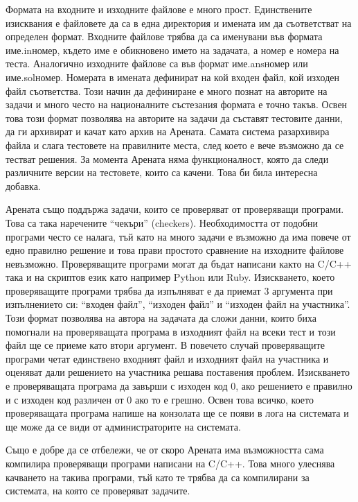 \documentclass[a4paper,12pt]{article}
\begin{document}
    Формата на входните и изходните файлове е много прост. Единствените изисквания е файловете да са в една директория и имената им да съответстват на определен формат. Входните файлове трябва да са именувани във формата {име}.in{номер}, където {име} е обикновено името на задачата, а {номер} е номера на теста. Аналогично изходните файлове са във формат {име}.ans{номер} или {име}.sol{номер}. Номерата в имената дефинират на кой входен файл, кой изходен файл съответства. Този начин да дефиниране е много познат на авторите на задачи и много често на националните състезания формата е точно такъв. Освен това този формат позволява на авторите на задачи да съставят тестовите данни, да ги архивират и качат като архив на Арената. Самата система разархивира файла и слага тестовете на правилните места, след което е вече възможно да се тестват решения. За момента Арената няма функционалност, която да следи различните версии на тестовете, които са качени. Това би била интересна добавка.
    
    Арената също поддържа задачи, които се проверяват от проверяващи програми. Това са така наречените ``чекъри'' (checkers). Необходимостта от подобни програми често се налага, тъй като на много задачи е възможно да има повече от едно правилно решение и това прави простото сравнение на изходните файлове невъзможно. Проверяващите програми могат да бъдат написани както на C/C++ така и на скриптов език като например Python или Ruby. Изискването, което проверяващите програми трябва да изпълняват е да приемат 3 аргумента при изпълнението си: ``входен файл'', ``изходен файл'' и ``изходен файл на участника''. Този формат позволява на автора на задачата да сложи данни, които биха помогнали на проверяващата програма в изходният файл на всеки тест и този файл ще се приеме като втори аргумент. В повечето случай проверяващите програми четат единствено входният файл и изходният файл на участника и оценяват дали решението на участника решава поставения проблем. Изискването е проверяващата програма да завърши с изходен код 0, ако решението е правилно и с изходен код различен от 0 ако то е грешно. Освен това всичко, което проверяващата програма напише на конзолата ще се появи в лога на системата и ще може да се види от администраторите на системата.
    
    Също е добре да се отбележи, че от скоро Арената има възможността сама компилира проверяващи програми написани на C/C++. Това много улеснява качването на такива програми, тъй като те трябва да са компилирани за системата, на която се проверяват задачите.
\end{document}
